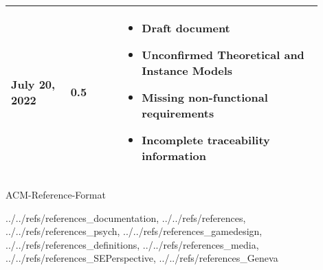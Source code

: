 \documentclass[11pt, titlepage]{article}
\begin{document}
\begin{center}
\begin{tabular}{m{0.17\linewidth}C{0.15\linewidth}m{0.58\linewidth}}
            \vspace*{1mm}July 20, 2022 & \vspace*{1mm}0.5 & \vspace*{5mm}
            \begin{itemize}[noitemsep, nosep]
                \item Draft document
                \item Unconfirmed Theoretical and Instance Models
                \item Missing non-functional requirements
                \item Incomplete traceability information
            \end{itemize} \\
            \bottomrule
        \end{tabular}
    \end{center}
    \vspace*{\fill}

    \clearpage

    \tableofcontents

    \clearpage

    \listoftables

    \listoffigures

    \clearpage

    

    \clearpage

    

    \clearpage

    

    \clearpage

    

    \clearpage

    

    \clearpage

    

    \clearpage

    

    \clearpage

     {ACM-Reference-Format}
    
    {../../refs/references_documentation, ../../refs/references,
    ../../refs/references_psych, ../../refs/references_gamedesign,
    ../../refs/references_definitions, ../../refs/references_media,
    ../../refs/references_SEPerspective, ../../refs/references_Geneva}

    \clearpage

    \begin{appendix}

        

        \clearpage

        

    \end{appendix}
\end{document}
